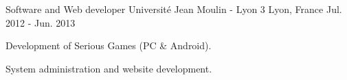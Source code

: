 \begin{cventries}

\cventry
{Software and Web developer} %
{Université Jean Moulin - Lyon 3} %
{Lyon, France} %
{Jul. 2012 - Jun. 2013} %
{ %
\begin{cvitems}
\item {Development of Serious Games (PC \& Android).}
\item {System administration and website development.}
\end{cvitems}
}


\end{cventries}